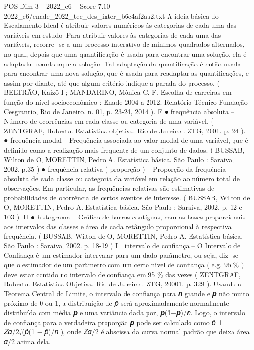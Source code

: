 \begin{textsample}{POS Dim 3 – 2022\_c6 – Score 7.00 – 2022\_c6/enade\_2022\_tec\_des\_inter\_b6c4af2aa2.txt}
A ideia básica do Escalamento Ideal é atribuir valores numéricos às categorias de cada uma das variáveis em estudo.
Para atribuir valores às categorias de cada uma das variáveis, recorre -se a um processo interativo de mínimos quadrados alternados, no qual, depois que uma quantificação é usada para encontrar uma solução, ela é adaptada usando aquela solução.
Tal adaptação da quantificação é então usada para encontrar uma nova solução, que é usada para readaptar as quantificações, e assim por diante, até que algum critério indique a parada do processo. ( BELTRÃO, Kaizô I ; MANDARINO, Mônica C.
F.
Escolha de carreiras em função do nível socioeconômico : Enade 2004 a 2012.
Relatório Técnico Fundação Cesgranrio, Rio de Janeiro. n. 01, p. 23-24, 2014 ).
F {\EmojiFont ●} frequência absoluta – Número de ocorrências em cada classe ou categoria de uma variável. ( ZENTGRAF, Roberto.
Estatística objetiva.
Rio de Janeiro : ZTG, 2001. p. 24 ). {\EmojiFont ●} frequência modal – Frequência associada ao valor modal de uma variável, que é definido como a realização mais frequente de um conjunto de dados. ( BUSSAB, Wilton de O, MORETTIN, Pedro A.
Estatística básica.
São Paulo : Saraiva, 2002. p.35 ) {\EmojiFont ●} frequência relativa ( proporção ) – Proporção da frequência absoluta de cada classe ou categoria da variável em relação ao número total de observações.
Em particular, as frequências relativas são estimativas de probabilidades de ocorrência de certos eventos de interesse. ( BUSSAB, Wilton de O, MORETTIN, Pedro A.
Estatística básica.
São Paulo : Saraiva, 2002. p. 12 e 103 ).
H {\EmojiFont ●} histograma – Gráfico de barras contíguas, com as bases proporcionais aos intervalos das classes e área de cada retângulo proporcional à respectiva frequência. ( BUSSAB, Wilton de O, MORETTIN, Pedro A.
Estatística básica.
São Paulo : Saraiva, 2002. p. 18-19 ) I  intervalo de confiança – O Intervalo de Confiança é um estimador intervalar para um dado parâmetro, ou seja, diz -se que o estimador de um parâmetro com um certo nível de confiança ( e.g. 95 \% ) deve estar contido no intervalo de confiança em 95 \% das vezes ( ZENTGRAF, Roberto.
Estatística Objetiva.
Rio de Janeiro : ZTG, 20001. p. 329 ).
Usando o Teorema Central do Limite, o intervalo de confiança para 𝒏 grande e 𝒑 não muito próximo de 0 ou 1, a distribuição de 𝑝̂ será aproximadamente normalmente distribuída com média 𝒑 e uma variância dada por, 𝒑(𝟏−𝒑)/𝒏.
Logo, o intervalo de confiança para a verdadeira proporção 𝒑 pode ser calculado como 𝑝̂ ± 𝑍𝛼/2√(𝑝̂(1 − 𝑝̂)/𝑛 ), onde 𝑍𝛼/2 é abscissa da curva normal padrão que deixa área 𝛼/2 acima dela.

\end{textsample}
